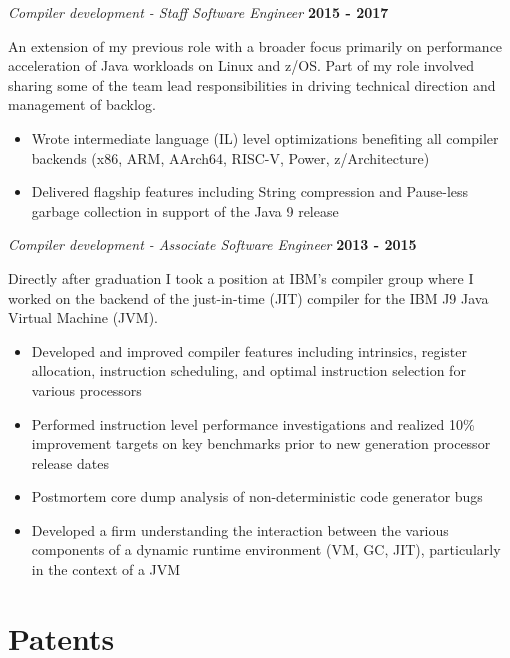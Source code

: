 \documentclass[margin,line]{res}
\begin{document}
\begin{resume}
{\em Compiler development - Staff Software Engineer} \hfill {\bf 2015 - 2017}
\vspace{-.12in}

An extension of my previous role with a broader focus primarily on performance acceleration of Java workloads on Linux
and z/OS. Part of my role involved sharing some of the team lead responsibilities in driving technical direction and
management of backlog.

\vspace{.10in}

\begin{itemize}
\item Wrote intermediate language (IL) level optimizations benefiting all compiler backends (x86, ARM, AArch64, RISC-V,
Power, z/Architecture)
\item Delivered flagship features including String compression and Pause-less garbage collection in support of the Java
9 release
\end{itemize}

{\em Compiler development - Associate Software Engineer} \hfill {\bf 2013 - 2015}
\vspace{-.12in}

Directly after graduation I took a position at IBM's compiler group where I worked on the backend of the just-in-time
(JIT) compiler for the IBM J9 Java Virtual Machine (JVM).

\vspace{.10in}

\begin{itemize}
\item Developed and improved compiler features including intrinsics, register allocation, instruction scheduling, 
and optimal instruction selection for various processors
\item Performed instruction level performance investigations and realized 10\% improvement targets on key benchmarks
prior to new generation processor release dates
\item Postmortem core dump analysis of non-deterministic code generator bugs
\item Developed a firm understanding the interaction between the various components of a dynamic runtime environment 
(VM, GC, JIT), particularly in the context of a JVM
\end{itemize}

\section{\sc Patents}


\end{resume}
\end{document}
